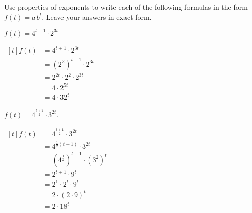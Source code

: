 \begin{exercises}
\begin{problem}	
Use properties of exponents to write each of the following formulas in the 
form $f(t)=a\,b^t$. Leave your answers in exact form. 
\begin{multicols}{2}
	\begin{subproblem}
		$f(t)=4^{t+1}\cdot 2^{3t}$
		\begin{shortsolution}
			$\begin{aligned}[t]
				f(t) & = 4^{t+1}\cdot 2^{3t}                  \\
				     & = \left( 2^2 \right)^{t+1}\cdot 2^{3t} \\
				     & = 2^{2t}\cdot 2^2\cdot 2^{3t}          \\
				     & = 4\cdot 2^{5t}                        \\
				     & = 4\cdot 32^t                          
			\end{aligned}$
		\end{shortsolution}
	\end{subproblem}
	\begin{subproblem}
		$f(t)=4^\frac{t+1}{2}\cdot 3^{2t}$. 
		\begin{shortsolution}
			$\begin{aligned}[t]
				f(t) & =  4^\frac{t+1}{2} \cdot 3^{2t}          \\
				     & =  4^{\frac{1}{2}(t+1)} \cdot 3^{2t}     \\
				     & =  (4^{\frac{1}{2}})^{t+1} \cdot (3^2)^t \\
				     & =  2^{t+1} \cdot 9^t                     \\
				     & =  2^1 \cdot 2^t \cdot 9^t               \\
				     & =  2 \cdot (2 \cdot 9)^t                 \\
				     & =  2 \cdot 18^t                          
			\end{aligned}$
		\end{shortsolution}
	\end{subproblem}
\end{multicols}
\end{problem}	


\end{exercises}
